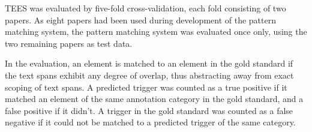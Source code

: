 
TEES was evaluated by five-fold cross-validation, each fold consisting of two papers. As eight papers had been used during development of the pattern matching system, the pattern matching system was evaluated once only, using the two remaining papers as test data.

In the evaluation, an element is matched to an element in the gold standard if the text spans exhibit any degree of overlap, thus abstracting away from exact scoping of text spans. A predicted trigger was counted as a true positive if it matched an element of the same annotation category in the gold standard, and a false positive if it didn't. A trigger in the gold standard was counted as a false negative if it could not be matched to a predicted trigger of the same category. 